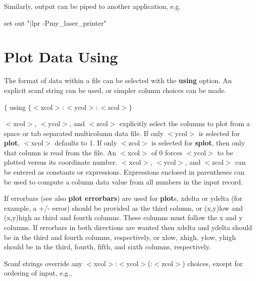 Similarly, output can be piped to another application, e.g.

        set out "$|$lpr -Pmy\_laser\_printer"

\section{Plot Data Using}
The format of data within a file can be selected with the {\bf using}
option. An explicit scanf string can be used, or simpler column
choices can be made.


{$\{$ using $\{ <$xcol$>:<$ycol$>:<$zcol$> \}$}

$<$xcol$>$, $<$ycol$>$, and $<$zcol$>$ explicitly select the columns
to plot from a space or tab separated multicolumn data file. If only
$<$ycol$>$ is selected for {\bf plot}, $<$xcol$>$ defaults to 1. If
only $<$zcol$>$ is selected for {\bf splot}, then only that column is
read from the file. An $<$xcol$>$ of 0 forces $<$ycol$>$ to be plotted
versus its coordinate number. $<$xcol$>$, $<$ycol$>$, and $<$zcol$>$
can be entered as constants or expressions.  Expressions enclosed in
parentheses can be used to compute a column data value from all
numbers in the input record.

If errorbars (see also {\bf plot errorbars}) are used for {\bf plot}s,
xdelta or ydelta (for example, a +/- error) should be provided as the
third column, or (x,y)low and (x,y)high as third and fourth columns.
These columns must follow the x and y columns. If errorbars in both
directions are wanted then xdelta and ydelta should be in the third
and fourth columns, respectively, or xlow, xhigh, ylow, yhigh should
be in the third, fourth, fifth, and sixth columns, respectively.

Scanf strings override any $<$xcol$>$:$<$ycol$>$(:$<$zcol$>$) choices,
except for ordering of input, e.g.,

